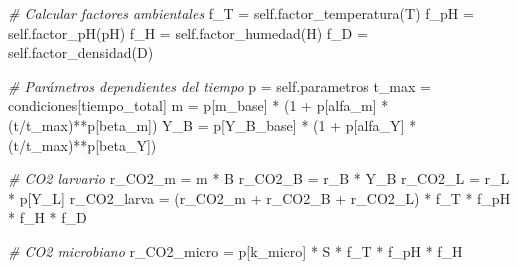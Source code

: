 \documentclass[
]{article}
\newenvironment{Shaded}{}{}
\newcommand{\CommentTok}[1]{\textcolor[rgb]{0.38,0.63,0.69}{\textit{#1}}}
\newcommand{\DecValTok}[1]{\textcolor[rgb]{0.25,0.63,0.44}{#1}}
\newcommand{\NormalTok}[1]{#1}
\newcommand{\OperatorTok}[1]{\textcolor[rgb]{0.40,0.40,0.40}{#1}}
\newcommand{\StringTok}[1]{\textcolor[rgb]{0.25,0.44,0.63}{#1}}
\newcommand{\VariableTok}[1]{\textcolor[rgb]{0.10,0.09,0.49}{#1}}
\begin{document}
\begin{Shaded}
\begin{Highlighting}[]
        \CommentTok{\# Calcular factores ambientales}
\NormalTok{        f\_T }\OperatorTok{=} \VariableTok{self}\NormalTok{.factor\_temperatura(T)}
\NormalTok{        f\_pH }\OperatorTok{=} \VariableTok{self}\NormalTok{.factor\_pH(pH)}
\NormalTok{        f\_H }\OperatorTok{=} \VariableTok{self}\NormalTok{.factor\_humedad(H)}
\NormalTok{        f\_D }\OperatorTok{=} \VariableTok{self}\NormalTok{.factor\_densidad(D)}
        
        \CommentTok{\# Parámetros dependientes del tiempo}
\NormalTok{        p }\OperatorTok{=} \VariableTok{self}\NormalTok{.parametros}
\NormalTok{        t\_max }\OperatorTok{=}\NormalTok{ condiciones[}\StringTok{\textquotesingle{}tiempo\_total\textquotesingle{}}\NormalTok{]}
\NormalTok{        m }\OperatorTok{=}\NormalTok{ p[}\StringTok{\textquotesingle{}m\_base\textquotesingle{}}\NormalTok{] }\OperatorTok{*}\NormalTok{ (}\DecValTok{1} \OperatorTok{+}\NormalTok{ p[}\StringTok{\textquotesingle{}alfa\_m\textquotesingle{}}\NormalTok{] }\OperatorTok{*}\NormalTok{ (t}\OperatorTok{/}\NormalTok{t\_max)}\OperatorTok{**}\NormalTok{p[}\StringTok{\textquotesingle{}beta\_m\textquotesingle{}}\NormalTok{])}
\NormalTok{        Y\_B }\OperatorTok{=}\NormalTok{ p[}\StringTok{\textquotesingle{}Y\_B\_base\textquotesingle{}}\NormalTok{] }\OperatorTok{*}\NormalTok{ (}\DecValTok{1} \OperatorTok{+}\NormalTok{ p[}\StringTok{\textquotesingle{}alfa\_Y\textquotesingle{}}\NormalTok{] }\OperatorTok{*}\NormalTok{ (t}\OperatorTok{/}\NormalTok{t\_max)}\OperatorTok{**}\NormalTok{p[}\StringTok{\textquotesingle{}beta\_Y\textquotesingle{}}\NormalTok{])}
        
        \CommentTok{\# CO2 larvario}
\NormalTok{        r\_CO2\_m }\OperatorTok{=}\NormalTok{ m }\OperatorTok{*}\NormalTok{ B}
\NormalTok{        r\_CO2\_B }\OperatorTok{=}\NormalTok{ r\_B }\OperatorTok{*}\NormalTok{ Y\_B}
\NormalTok{        r\_CO2\_L }\OperatorTok{=}\NormalTok{ r\_L }\OperatorTok{*}\NormalTok{ p[}\StringTok{\textquotesingle{}Y\_L\textquotesingle{}}\NormalTok{]}
\NormalTok{        r\_CO2\_larva }\OperatorTok{=}\NormalTok{ (r\_CO2\_m }\OperatorTok{+}\NormalTok{ r\_CO2\_B }\OperatorTok{+}\NormalTok{ r\_CO2\_L) }\OperatorTok{*}\NormalTok{ f\_T }\OperatorTok{*}\NormalTok{ f\_pH }\OperatorTok{*}\NormalTok{ f\_H }\OperatorTok{*}\NormalTok{ f\_D}
        
        \CommentTok{\# CO2 microbiano}
\NormalTok{        r\_CO2\_micro }\OperatorTok{=}\NormalTok{ p[}\StringTok{\textquotesingle{}k\_micro\textquotesingle{}}\NormalTok{] }\OperatorTok{*}\NormalTok{ S }\OperatorTok{*}\NormalTok{ f\_T }\OperatorTok{*}\NormalTok{ f\_pH }\OperatorTok{*}\NormalTok{ f\_H}
        

\end{Highlighting}
\end{Shaded}
\end{document}
